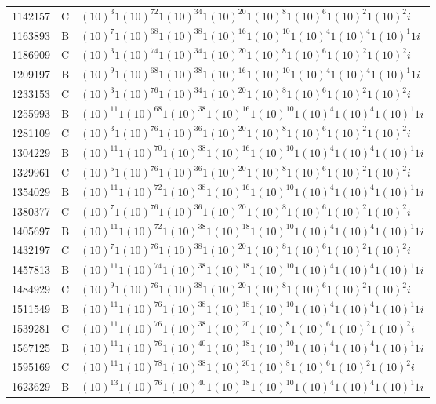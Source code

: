 \documentclass[12pt]{article}
\begin{document}
\begin{table}[H]
\begin{Parallel}[c]{0.48\textwidth}{0.48\textwidth}
{{\begin{tiny}
\begin{tabular}{rrl}
1142157&C&$(10)^{3}1(10)^{72}1(10)^{34}1(10)^{20}1(10)^{8}1(10)^{6}1(10)^{2}1(10)^{2}i$\\
1163893&B&$(10)^{7}1(10)^{68}1(10)^{38}1(10)^{16}1(10)^{10}1(10)^{4}1(10)^{4}1(10)^{1}1i$\\
1186909&C&$(10)^{3}1(10)^{74}1(10)^{34}1(10)^{20}1(10)^{8}1(10)^{6}1(10)^{2}1(10)^{2}i$\\
1209197&B&$(10)^{9}1(10)^{68}1(10)^{38}1(10)^{16}1(10)^{10}1(10)^{4}1(10)^{4}1(10)^{1}1i$\\
1233153&C&$(10)^{3}1(10)^{76}1(10)^{34}1(10)^{20}1(10)^{8}1(10)^{6}1(10)^{2}1(10)^{2}i$\\
1255993&B&$(10)^{11}1(10)^{68}1(10)^{38}1(10)^{16}1(10)^{10}1(10)^{4}1(10)^{4}1(10)^{1}1i$\\
1281109&C&$(10)^{3}1(10)^{76}1(10)^{36}1(10)^{20}1(10)^{8}1(10)^{6}1(10)^{2}1(10)^{2}i$\\
1304229&B&$(10)^{11}1(10)^{70}1(10)^{38}1(10)^{16}1(10)^{10}1(10)^{4}1(10)^{4}1(10)^{1}1i$\\
1329961&C&$(10)^{5}1(10)^{76}1(10)^{36}1(10)^{20}1(10)^{8}1(10)^{6}1(10)^{2}1(10)^{2}i$\\
1354029&B&$(10)^{11}1(10)^{72}1(10)^{38}1(10)^{16}1(10)^{10}1(10)^{4}1(10)^{4}1(10)^{1}1i$\\
1380377&C&$(10)^{7}1(10)^{76}1(10)^{36}1(10)^{20}1(10)^{8}1(10)^{6}1(10)^{2}1(10)^{2}i$\\
1405697&B&$(10)^{11}1(10)^{72}1(10)^{38}1(10)^{18}1(10)^{10}1(10)^{4}1(10)^{4}1(10)^{1}1i$\\
1432197&C&$(10)^{7}1(10)^{76}1(10)^{38}1(10)^{20}1(10)^{8}1(10)^{6}1(10)^{2}1(10)^{2}i$\\
1457813&B&$(10)^{11}1(10)^{74}1(10)^{38}1(10)^{18}1(10)^{10}1(10)^{4}1(10)^{4}1(10)^{1}1i$\\
1484929&C&$(10)^{9}1(10)^{76}1(10)^{38}1(10)^{20}1(10)^{8}1(10)^{6}1(10)^{2}1(10)^{2}i$\\
1511549&B&$(10)^{11}1(10)^{76}1(10)^{38}1(10)^{18}1(10)^{10}1(10)^{4}1(10)^{4}1(10)^{1}1i$\\
1539281&C&$(10)^{11}1(10)^{76}1(10)^{38}1(10)^{20}1(10)^{8}1(10)^{6}1(10)^{2}1(10)^{2}i$\\
1567125&B&$(10)^{11}1(10)^{76}1(10)^{40}1(10)^{18}1(10)^{10}1(10)^{4}1(10)^{4}1(10)^{1}1i$\\
1595169&C&$(10)^{11}1(10)^{78}1(10)^{38}1(10)^{20}1(10)^{8}1(10)^{6}1(10)^{2}1(10)^{2}i$\\
1623629&B&$(10)^{13}1(10)^{76}1(10)^{40}1(10)^{18}1(10)^{10}1(10)^{4}1(10)^{4}1(10)^{1}1i$\\

\end{tabular}
\end{tiny}}}
\end{Parallel}
\end{table}
\end{document}
